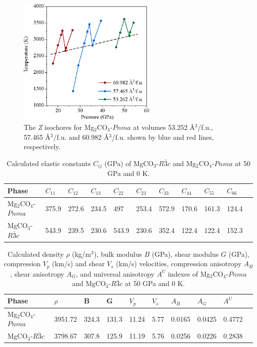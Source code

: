 \documentclass[a4paperm]{article}
\begin{document}
\begin{figure}[H]
	\includegraphics[width=0.6\textwidth]{Zcurve} \centering
	\caption{The {\it Z} isochores for Mg$_2$CO$_4$-$Pnma$ at volumes 53.252 \AA{$^3$}/f.u., 57.465 \AA{$^3$}/f.u. and 60.982 \AA{$^3$}/f.u. shown by blue and red lines, respectively.} \label{Zcurve}
\end{figure}

	\begin{table}[H]
	\caption{Calculated elastic constants $C_{ij}$ (GPa) of MgCO$_3$-$R\bar{3}c$ and Mg$_2$CO$_4$-$Pnma$ at 50 GPa and 0 K.} \label{elastic_const} \vspace{2mm} 
	\begin{tabular}{l*{10}{l}}
		\hline \hline
Phase	&	$C_{11}$	&	$C_{12}$	&	$C_{13}$	&	$C_{22}$	&	$C_{23}$	&	$C_{33}$	&	$C_{44}$	&	$C_{55}$	&	$C_{66}$	\\
\hline
Mg$_2$CO$_4$-$Pnma$	&	375.9	&	272.6	&	234.5	&	497	&	253.4	&	572.9	&	170.6	&	161.3	&	124.4	\\                                                                                              
MgCO$_3$-$R\bar{3}c$	&	543.9	&	239.5	&	230.6	&	543.9	&	230.6	&	352.4	&	122.4	&	122.4	&	152.3	\\

		\hline \hline
	\end{tabular}
\end{table}

	\begin{table}[H]
	\caption{Calculated density $\rho$ (kg/m$^3$), bulk modulus $B$ (GPa), shear modulus $G$ (GPa), compression $V_p$ (km/s) and shear $V_s$ (km/s) velocities, compression anisotropy $A_B$, shear anisotropy $A_G$, and universal anisotropy $A^U$ indexes of Mg$_2$CO$_4$-$Pnma$ and MgCO$_3$-$R\bar{3}c$ at 50 GPa and 0 K.} \vspace{2mm} \label{moduli}
		\begin{tabular}{l*{9}{l}}
			\hline \hline
					
			Phase	& $\rho$	& B &	G	& $V_p$&  $V_s$ &	$A_B$	&	$A_G$	&	$A^U$	\\
			\hline
			Mg$_2$CO$_4$-$Pnma$	& 3951.72 &	324.3	&	131.3	& 11.24  & 5.77 &	0.0165	&	0.0425	&	0.4772	\\
			MgCO$_3$-$R\bar{3}c$ & 3798.67 &	307.8	&	125.9	& 11.19 & 5.76	&   0.0256	&	0.0226	&	0.2838	\\
			
			\hline \hline
	\end{tabular}
\end{table}




\end{document}
